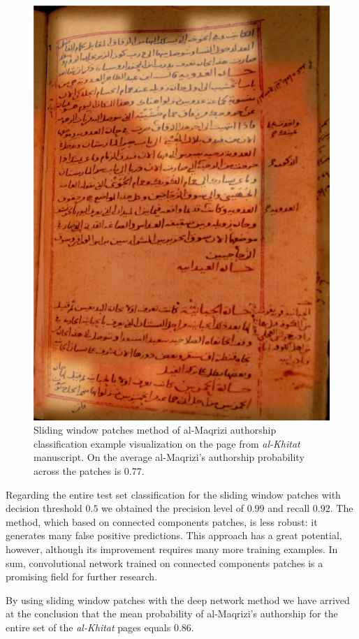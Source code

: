 \documentclass[conference]{IEEEtran}
\begin{document}
\begin{figure}[!t]
	\centering
  \includegraphics[width=0.49\linewidth]{figures/hitat_15_fixed.png}
   \caption{Sliding window patches method of al-Maqrizi authorship classification example visualization on the page from {\it al-Khitat} manuscript. On the average al-Maqrizi's authorship probability across the patches is 0.77.}
	\label{fig:al_maqrizi_classification_example_test_hitat}
\end{figure}

Regarding the entire test set classification for the sliding window patches with decision threshold $0.5$ we obtained the precision level of $0.99$ and recall $0.92$. The method, which based on connected components patches, is less robust: it generates many false positive predictions. This approach has a great potential, however, although its improvement requires many more training examples. In sum, convolutional network trained on connected components patches is a promising field for further research.

By using sliding window patches with the deep network method we have arrived at the conclusion that the mean probability of al-Maqrizi's authorship for the entire set of the {\it al-Khitat} pages equals $0.86$. 
\end{document}
